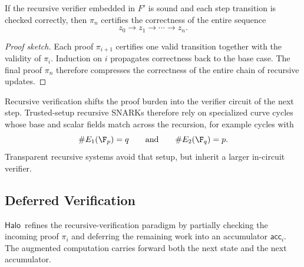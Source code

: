 \documentclass[11pt]{article}
\newcommand{\Halo}{\ensuremath{\mathsf{Halo}}}
\begin{document}
\begin{proposition}
If the recursive verifier embedded in $F'$ is sound and each step transition is
checked correctly, then $\pi_n$ certifies the correctness of the entire
sequence
\[
  z_0 \to z_1 \to \cdots \to z_n.
\]
\end{proposition}

\begin{proof}[Proof sketch]
Each proof $\pi_{i+1}$ certifies one valid transition together with the
validity of $\pi_i$.  Induction on $i$ propagates correctness back to the base
case.  The final proof $\pi_n$ therefore compresses the correctness of the
entire chain of recursive updates.
\end{proof}

\begin{remark}
Recursive verification shifts the proof burden into the verifier circuit of the
next step.  Trusted-setup recursive SNARKs therefore rely on specialized curve
cycles whose base and scalar fields match across the recursion, for example
cycles with
\[
  \#E_1(\F_p)=q
  \qquad\text{and}\qquad
  \#E_2(\F_q)=p.
\]
Transparent recursive systems avoid that setup, but inherit a larger
in-circuit verifier.
\end{remark}

\subsection{Deferred Verification}

\Halo\ refines the recursive-verification paradigm by partially checking the
incoming proof $\pi_i$ and deferring the remaining work into an accumulator
$\mathsf{acc}_i$.  The augmented computation carries forward both the next state
and the next accumulator.
\end{document}
